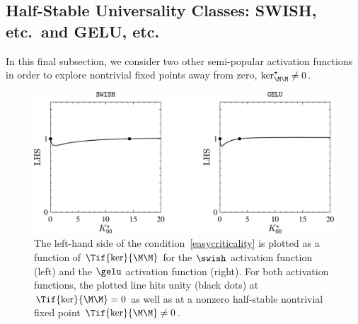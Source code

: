 \subsection{Half-Stable Universality Classes: SWISH, etc.~and GELU, etc.}\label{subsec:half_stability}
In this final subsection, we consider two other semi-popular activation functions in order to explore nontrivial fixed points away from zero, $\ker_{\M\M}^{\star}\ne 0$.
 \begin{figure}[ht]
\begin{center}
 \includegraphics[width=0.85\linewidth]{./book_figures/criticality_condition_swish_and_gelu}
\end{center}
\caption{The left-hand side of the condition~\eqref{easycriticality} is plotted as a function of $\Tif{\ker}{\M\M}$ for the $\swish$ activation function (left) and the $\gelu$ activation function (right).
For both activation functions, the plotted line hits unity (black dots) at $\Tif{\ker}{\M\M}=0$ as well as at a nonzero half-stable nontrivial fixed point $\Tif{\ker}{\M\M}\ne0$.}
\label{fig:half-crit}
\end{figure}
